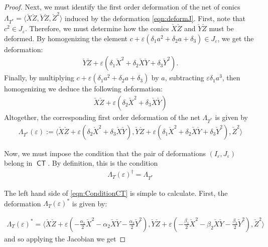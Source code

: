 \documentclass{article}
\DeclareMathOperator{\CT}{\mathsf{CT}}
\begin{document}
\begin{proof}
Next, we must identify the first order deformation of the net of
conics $\Lambda_{T^{*}} = \langle \check{X}\check{Z}, \check{Y}\check{Z}, \check{Z}^{2} \rangle$ induced by
the deformation \eqref{eqn:deformJ}.  First, note that
$c^{2} \in J_{\varepsilon}$. Therefore, we must determine how the
conics $\check{X}\check{Z}$ and $\check{Y}\check{Z}$ must be deformed.  By homogenizing the element
$c + \varepsilon(\delta_{1}a^{2}+\delta_{2}a + \delta_{3}) \in
J_{\varepsilon}$, we get the deformation:
\begin{eqnarray*}
  \check{Y}\check{Z} + \varepsilon(\delta_{1}\check{X}^{2}+\delta_{2}\check{X}\check{Y} + \delta_{3}\check{Y}^{2}).
\end{eqnarray*}
Finally, by multiplying
$c + \varepsilon(\delta_{1}a^{2}+\delta_{2}a + \delta_{3})$ by $a$,
subtracting $\varepsilon \delta_{1} a^{3}$, then homogenizing we
deduce the following deformation:
\begin{eqnarray*}
  \check{X}\check{Z} + \varepsilon(\delta_{2}\check{X}^{2} + \delta_{3}\check{X}\check{Y})
\end{eqnarray*} Altogether, the corresponding first order deformation of the net $\Lambda_{T^{*}}$ is given by  
\begin{eqnarray}
  \label{deformLambdaprime}
  \Lambda_{T^{*}}(\varepsilon) := \langle \check{X}\check{Z} + \varepsilon(\delta_{2}\check{X}^{2} + \delta_{3}\check{X}\check{Y}), \check{Y}\check{Z} + \varepsilon(\delta_{1}\check{X}^{2}+\delta_{2}\check{X}\check{Y} + \delta_{3}\check{Y}^{2}), \check{Z}^{2} \rangle 
\end{eqnarray}

Now, we must impose the condition that the pair of deformations
$(I_{\varepsilon}, J_{\varepsilon})$ belong in $\CT$. By definition,
this is the condition
\begin{eqnarray}\label{eqn:ConditionCT}
  \Lambda_{T}(\varepsilon)^{\dagger} = \Lambda_{T^{*}}
\end{eqnarray}


The left hand side of \eqref{eqn:ConditionCT} is simple to calculate.  First, the deformation $\Lambda_{T}(\varepsilon)^{*}$ is given by: 

\begin{eqnarray*}
  \Lambda_{T}(\varepsilon)^{*} = \langle \check{X}\check{Z} + \varepsilon(-\frac{\alpha_{1}}{2} \check{X}^{2} - \alpha_{2}\check{X}\check{Y} - \frac{\alpha_{3}}{2} \check{Y}^{2}), \check{Y}\check{Z} + \varepsilon(-\frac{\beta_{1}}{2} \check{X}^{2}-\beta_{2}\check{X}\check{Y} - \frac{\beta_{3}}{2} \check{Y}^{2}), \check{Z}^{2} \rangle
\end{eqnarray*}
and so applying the Jacobian we get 


\end{proof}
\end{document}
